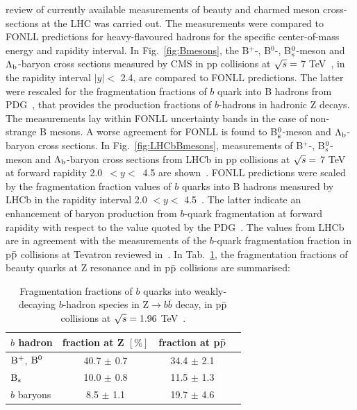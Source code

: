 review of currently available measurements of beauty and 
charmed meson cross-sections at the LHC was carried out. The measurements 
were compared to FONLL predictions for heavy-flavoured hadrons 
for the specific center-of-mass energy and rapidity interval.
In Fig.~\ref{fig:Bmesons}, the B$^{+}$-, B$^{0}$-, B$^0_{\rm s}$-meson and 
$\Lambda_{\rm b}$-baryon cross sections measured by CMS in pp collisions 
at $\sqrt{s} = $ 7 TeV~\cite{Khachatryan:2011mk,Chatrchyan:2011pw,Chatrchyan:2011vh,Chatrchyan:2012xg},
in the rapidity interval $|y| <$ 2.4, are compared to FONLL predictions. 
The latter were rescaled for the fragmentation fractions of $b$ quark into 
B hadrons from PDG~\cite{Patrignani:2016xqp}, that provides the production 
fractions of $b$-hadrons in hadronic Z decays.
The measurements lay within FONLL uncertainty bands in the case 
of non-strange B mesons. A worse agreement for FONLL is found to B$^0_{\rm s}$-meson
and $\Lambda_{\rm b}$-baryon cross sections.
In Fig.~\ref{fig:LHCbBmesons}, measurements of B$^{+}$-, B$^0_{\rm s}$-meson
and $\Lambda_{\rm b}$-baryon cross sections from
LHCb in pp collisions at $\sqrt{s} =$ 7 TeV at forward rapidity 
\mbox{2.0 $< y <$ 4.5} are shown~\cite{Aaij:2013noa,Aaij:2015fea}.
FONLL predictions were scaled by the fragmentation fraction values 
of $b$ quarks into B hadrons measured by LHCb in the rapidity interval 
2.0 $< y <$ 4.5~\cite{Aaij:2011jp}. The latter indicate an 
enhancement of baryon production from $b$-quark fragmentation at forward rapidity with respect to 
the value quoted by the PDG~\cite{Patrignani:2016xqp}. The values from LHCb are in agreement with the measurements
of the $b$-quark fragmentation fraction in p$\bar{\rm p}$ collisions at Tevatron reviewed in~\cite{Patrignani:2016xqp}.
In Tab.~\ref{tab:fragFrac}, the fragmentation fractions of beauty quarks at Z resonance and
in p$\bar{\rm p}$ collisions are summarised:\\
\begin{table}[!h]
\centering
\begin{tabular}{l|ccc}
 \hline 
\hline
$b$ hadron & fraction at Z $[\%]$  & fraction at p$\bar{\rm p}$ \\
\hline 
${\rm B}^{+}$, ${\rm B}^{0}$    &     40.7 $\pm$ 0.7   & 34.4 $\pm$ 2.1 \\
${\rm B}_{s}$                 &     10.0 $\pm$ 0.8   & 11.5 $\pm$ 1.3 \\
$b$ baryons          &       8.5 $\pm$ 1.1   & 19.7 $\pm$ 4.6 \\
 \hline 
\hline
\end{tabular}
\caption{Fragmentation fractions of $b$ quarks into weakly-decaying $b$-hadron species in Z$ \rightarrow b\bar{b}$ decay, in p$\bar{\rm p}$ collisions at $\sqrt{s} = 1.96$ TeV~\cite{Patrignani:2016xqp}.}
\label{tab:fragFrac}
\end{table}





